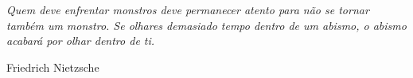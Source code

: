 \newpage
\vspace*{\fill}
\epigraph{\textit{Quem deve enfrentar monstros deve permanecer atento para
não se tornar também um monstro. Se olhares demasiado tempo dentro de um abismo,  o abismo acabará por olhar dentro de ti.}}{Friedrich Nietzsche}




